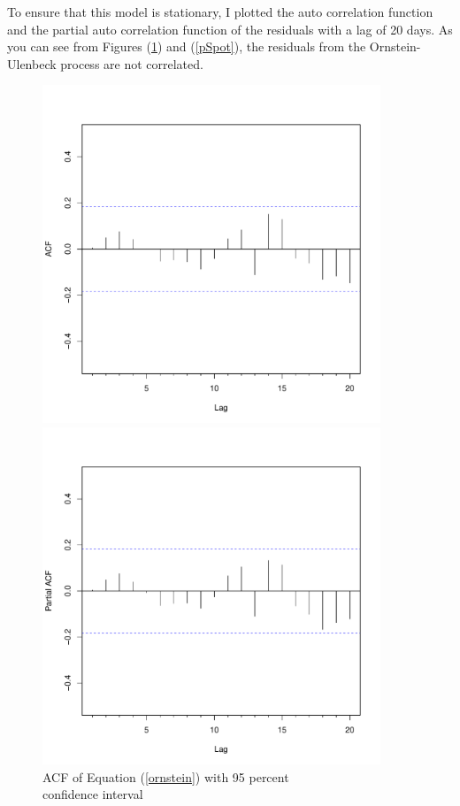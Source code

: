 \documentclass{paper}
\let\oldref\ref
\renewcommand{\ref}[1]{(\oldref{#1})}
\begin{document}
\begin{doublespacing}
To ensure that this model is stationary, I plotted the auto correlation function and the partial auto correlation function of the residuals with a lag of 20 days. As you can see from Figures \ref{aSpot} and \ref{pSpot}, the residuals from the Ornstein-Ulenbeck process are not correlated.
\begin{figure}[H]
    \centering
    \begin{minipage}{0.5\textwidth}
        \centering
        \includegraphics[width=0.9\textwidth]{acfSpot.pdf} %
        \caption{ACF of Equation \ref{ornstein} with 95 percent\\ confidence interval}\label{aSpot}
    \end{minipage}\hfill
    \begin{minipage}{0.5\textwidth}
        \centering
        \includegraphics[width=0.9\textwidth]{pacfSpot.pdf} %

\end{minipage}
\end{figure}
\end{doublespacing}
\end{document}
